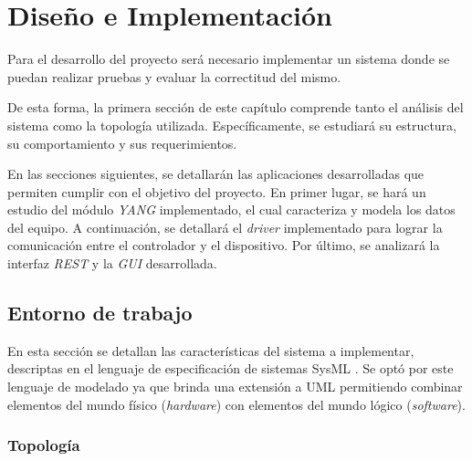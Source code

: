 
\chapter{Diseño e Implementación} %

\label{Chapter4} %
Para el desarrollo del proyecto será necesario implementar un sistema donde se puedan realizar pruebas y evaluar la correctitud del mismo. 

De esta forma, la primera sección de este capítulo comprende tanto el análisis del sistema como la topología utilizada. Específicamente, se estudiará su estructura, su comportamiento y sus requerimientos. 

En las secciones siguientes, se detallarán las aplicaciones desarrolladas que permiten cumplir con el objetivo del proyecto. En primer lugar, se hará un estudio del módulo \textit{YANG} implementado, el cual caracteriza y modela los datos del equipo. A continuación, se detallará el \textit{driver} implementado para lograr la comunicación entre el controlador y el dispositivo. Por último, se analizará la interfaz \textit{REST} y la \textit{GUI} desarrollada.


\section{Entorno de trabajo}
En esta sección se detallan las características del sistema a implementar, descriptas en el lenguaje de especificación de sistemas SysML \parencite{sysml}. Se optó por este lenguaje de modelado ya que brinda una extensión a UML permitiendo combinar elementos del mundo físico (\textit{hardware}) con elementos del mundo lógico (\textit{software}). 


\subsection{Topología}

